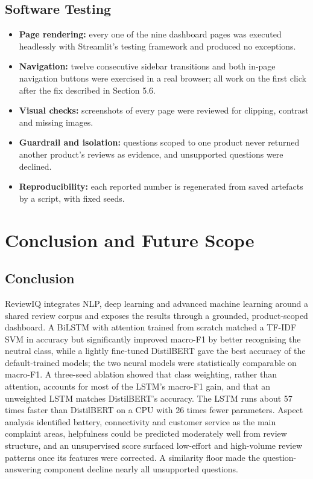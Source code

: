 \documentclass[12pt,a4paper]{report}
\begin{document}
\section{Software Testing}
\begin{itemize}
\item \textbf{Page rendering:} every one of the nine dashboard pages was executed headlessly with Streamlit's testing framework and produced no exceptions.
\item \textbf{Navigation:} twelve consecutive sidebar transitions and both in-page navigation buttons were exercised in a real browser; all work on the first click after the fix described in Section 5.6.
\item \textbf{Visual checks:} screenshots of every page were reviewed for clipping, contrast and missing images.
\item \textbf{Guardrail and isolation:} questions scoped to one product never returned another product's reviews as evidence, and unsupported questions were declined.
\item \textbf{Reproducibility:} each reported number is regenerated from saved artefacts by a script, with fixed seeds.
\end{itemize}

\chapter{Conclusion and Future Scope}
\section{Conclusion}
ReviewIQ integrates NLP, deep learning and advanced machine learning around a shared review corpus and exposes the results through a grounded, product-scoped dashboard. A BiLSTM with attention trained from scratch matched a TF-IDF SVM in accuracy but significantly improved macro-F1 by better recognising the neutral class, while a lightly fine-tuned DistilBERT gave the best accuracy of the default-trained models; the two neural models were statistically comparable on macro-F1. A three-seed ablation showed that class weighting, rather than attention, accounts for most of the LSTM's macro-F1 gain, and that an unweighted LSTM matches DistilBERT's accuracy. The LSTM runs about 57 times faster than DistilBERT on a CPU with 26 times fewer parameters. Aspect analysis identified battery, connectivity and customer service as the main complaint areas, helpfulness could be predicted moderately well from review structure, and an unsupervised score surfaced low-effort and high-volume review patterns once its features were corrected. A similarity floor made the question-answering component decline nearly all unsupported questions.
\end{document}
